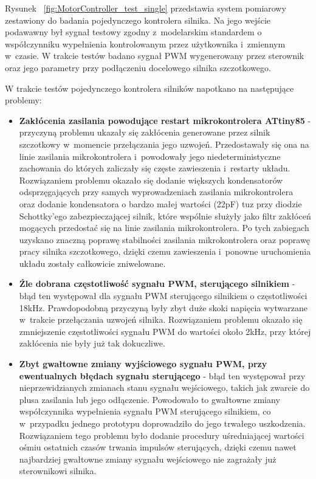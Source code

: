 \documentclass[11pt, twoside]{Thesis} %
\begin{document}
Rysunek ~\ref{fig:MotorController_test_single} przedstawia system pomiarowy zestawiony do badania pojedynczego kontrolera silnika. Na jego wejście podawawny był sygnał testowy zgodny z~modelarskim standardem o współczynniku wypełnienia kontrolowanym przez użytkownika i~zmiennym w~czasie. W trakcie testów badano sygnał PWM wygenerowany przez sterownik oraz jego parametry przy podłączeniu docelowego silnika szczotkowego.

W trakcie testów pojedynczego kontrolera silników napotkano na następujące problemy:
\begin{itemize}
	\item \textbf{Zakłócenia zasilania powodujące restart mikrokontrolera ATtiny85} - przyczyną problemu ukazały się zakłócenia generowane przez silnik szczotkowy w~momencie przełączania jego uzwojeń. Przedostawały się ona na linie zasilania mikrokontrolera i~powodowały jego niedeterministyczne zachowania do których zaliczały się częste zawieszenia i~restarty układu. Rozwiązaniem problemu okazało się dodanie większych kondensatorów odsprzęgających przy samych wyprowadzeniach zasilania mikrokontrolera oraz dodanie kondensatora o bardzo małej wartości (22pF) tuz przy diodzie Schottky'ego zabezpieczającej silnik, które wspólnie służyły jako  filtr zakłóceń mogących przedostać się na linie zasilania mikrokontrolera. Po tych zabiegach uzyskano znaczną poprawę stabilności zasilania mikrokontrolera oraz poprawę pracy silnika szczotkowego, dzięki czemu zawieszenia i~ponowne uruchomienia układu zostały całkowicie zniwelowane.
	\item \textbf{Źle dobrana częstotliwość sygnału PWM, sterującego silnikiem} - błąd ten występował dla sygnału PWM sterującego silnikiem o częstotliwości 18kHz. Prawdopodobną przyczyną były zbyt duże skoki napięcia wytwarzane w~trakcie przełączania uzwojeń silnika. Rozwiązaniem problemu okazało się zmniejszenie częstotliwości sygnału PWM do wartości około 2kHz, przy której zakłócenia nie były już tak dokuczliwe.
	\item \textbf{Zbyt gwałtowne zmiany wyjściowego sygnału PWM, przy ewentualnych błędach sygnału sterującego} - błąd ten występował przy nieprzewidzianych zmianach stanu sygnału wejściowego, takich jak zwarcie do plusa zasilania lub jego odłączenie. Powodowało to gwałtowne zmiany współczynnika wypełnienia sygnału PWM sterującego silnikiem, co w~przypadku jednego prototypu doprowadziło do jego trwałego uszkodzenia. Rozwiązaniem tego problemu było dodanie procedury uśredniającej wartości ośmiu ostatnich czasów trwania impulsów sterujących, dzięki czemu nawet najbardziej gwałtowne zmiany sygnału wejściowego nie zagrażały już sterownikowi silnika.
\end{itemize}
\end{document}
